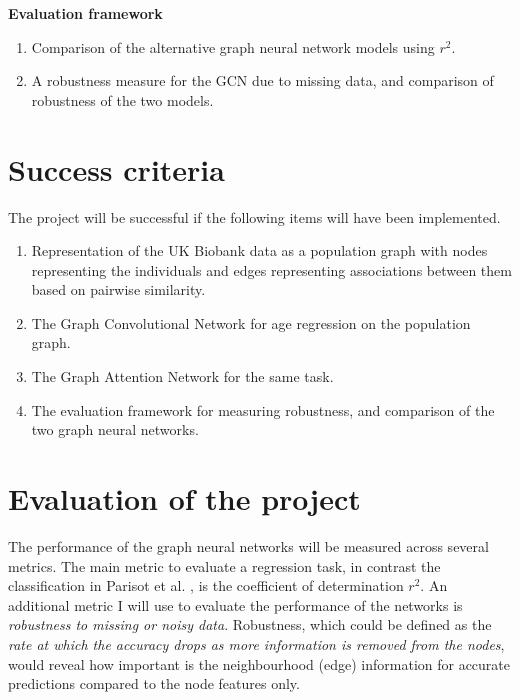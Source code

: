 \documentclass[12pt,a4paper,twoside]{article}
\begin{document}
\textbf{Evaluation framework}

\begin{enumerate}[label=E\arabic*.]
  \item  Comparison of the alternative graph neural network models using $r^2$.
  \item A robustness measure for the GCN due to missing data, and comparison of robustness of the two models.
\end{enumerate}

\section*{Success criteria}
The project will be successful if the following items will have been implemented.
\begin{enumerate}[label=SC\arabic*.]
  \item Representation of the UK Biobank data as a population graph with nodes representing the individuals and edges representing associations between them based on pairwise similarity.
  \item The Graph Convolutional Network for age regression on the population graph.
  \item The Graph Attention Network for the same task.
  \item The evaluation framework for measuring robustness, and comparison of the two graph neural networks.
\end{enumerate}

\section*{Evaluation of the project}
The performance of the graph neural networks will be measured across several metrics. The main metric to evaluate a regression task, in contrast the classification in Parisot et al. \cite{parisot2018disease}, is the coefficient of determination $r^2$. An additional metric I will use to evaluate the performance of the networks is \textit{robustness to missing or noisy data}. Robustness, which could be defined as the \textit{rate at which the accuracy drops as more information is removed from the nodes}, would reveal how important is the neighbourhood (edge) information for accurate predictions compared to the node features only.
\end{document}
